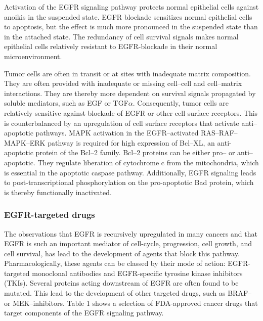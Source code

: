 {{        Activation of the EGFR signaling pathway protects normal
        epithelial cells against anoikis in the suspended state. EGFR blockade
        sensitizes normal epithelial cells to apoptosis, but the effect is much
        more pronounced in the suspended state than in the attached state. The
        redundancy of cell survival signals makes normal epithelial cells
        relatively resistant to EGFR-blockade in their normal microenvironment.

        Tumor cells are often in transit or at sites with inadequate matrix
        composition. They are often provided with inadequate or missing
        cell--cell and cell--matrix interactions. They are thereby more dependent
        on survival signals propagated by soluble mediators, such as EGF or
        TGF$\alpha$. Consequently, tumor cells are relatively sensitive against
        blockade of EGFR or other cell surface receptors. This is counterbalanced by an upregulation of cell
        surface receptors that activate anti--apoptotic pathways. MAPK
        activation in the EGFR--activated RAS--RAF--MAPK--ERK pathway is
        required for high expression of Bcl--XL, an anti-apoptotic protein of
        the Bcl--2 family. Bcl--2 proteins can be either pro-- or
        anti--apoptotic. They regulate liberation of cytochrome c from the
        mitochondria, which is essential in the apoptotic caspase pathway.
        Additionally, EGFR signaling leads to post-transcriptional
        phosphorylation on the pro-apoptotic Bad protein, which is thereby
        functionally inactivated.

    \subsubsection{EGFR-targeted drugs}

      The observations that EGFR is recursively upregulated in many cancers
      and that EGFR is such an important mediator of cell-cycle,
      progression, cell growth, and cell survival, has lead to the
      development of agents that block this pathway. Pharmacologically,
      these agents can be classed by their mode of action: EGFR-targeted
      monoclonal antibodies and EGFR-specific tyrosine kinase inhibitors (TKIs).
      Several proteins acting downstream of EGFR are often
      found to be mutated. This lead to the development of other targeted
      drugs, such as BRAF-- or MEK--inhibitors. Table 1 shows a selection
      of FDA-approved cancer drugs that target components of the EGFR signaling
      pathway.

}}
